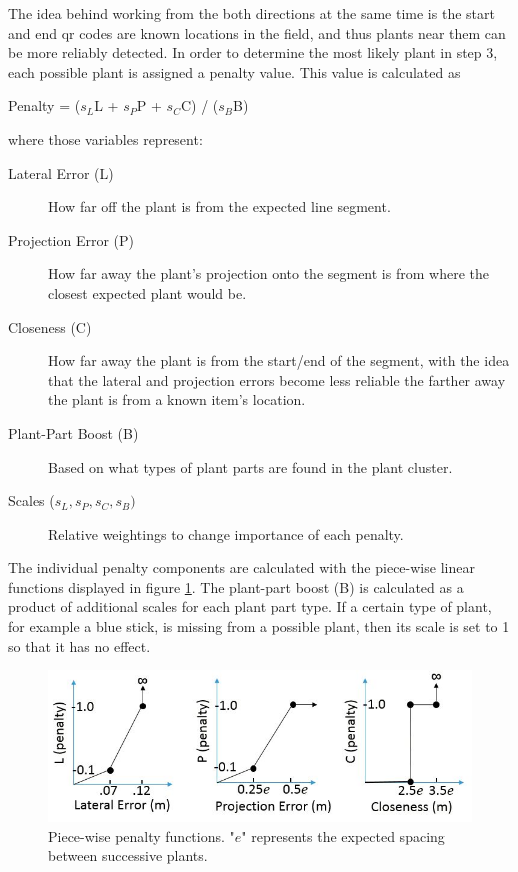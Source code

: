 The idea behind working from the both directions at the same time is the start and end \ac{qr} codes are known locations in the field, and thus plants near them can be more reliably detected.  In order to determine the most likely plant in step 3, each possible plant is assigned a penalty value.  This value is calculated as

\begin{center}
Penalty = ($s_L$L + $s_P$P + $s_C$C) / ($s_B$B)
\end{center}
where those variables represent:

\begin{description}
\item[Lateral Error (L)] How far off the plant is from the expected line segment.
\item[Projection Error (P)] How far away the plant's projection onto the segment is from where the closest expected plant would be.
\item[Closeness (C)] How far away the plant is from the start/end of the segment, with the idea that the lateral and projection errors become less reliable the farther away the plant is from a known item's location.
\item[Plant-Part Boost (B)] Based on what types of plant parts are found in the plant cluster.
\item[Scales ($s_L,s_P,s_C,s_B)$] Relative weightings to change importance of each penalty.
\end{description}

The individual penalty components are calculated with the piece-wise linear functions displayed in figure \ref{figure:piecewise_penalties}.  The plant-part boost (B) is calculated as a product of additional scales for each plant part type.  If a certain type of plant, for example a blue stick, is missing from a possible plant, then its scale is set to 1 so that it has no effect.  

\begin{figure}
	\centering
    \includegraphics[width=5.5in]{figures/piece_wise.jpg}
    \caption[Penalty functions]{Piece-wise penalty functions. "$e$" represents the expected spacing between successive plants.}
    \label{figure:piecewise_penalties}
\end{figure}

